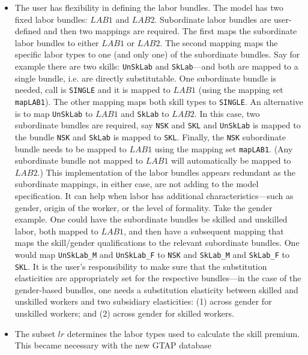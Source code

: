 \begin{itemize}
   \item The user has flexibility in defining the labor bundles. The model has
   two fixed labor bundles: $\mathit{LAB1}$ and $\mathit{LAB2}$. Subordinate labor
   bundles are user-defined and then two mappings are required. The first
   maps the subordinate labor bundles to either $\mathit{LAB1}$ or $\mathit{LAB2}$.
   The second mapping maps the specific labor types to one (and only one) of the
   subordinate bundles. Say for example there are two skills: \texttt{UnSkLab} and
   \texttt{SkLab}---and both are mapped to a single bundle, i.e. are directly
   substitutable. One subordinate bundle is needed, call is \texttt{SINGLE} and
   it is mapped to $\mathit{LAB1}$ (using the mapping set \texttt{mapLAB1}).
   The other mapping maps both skill types to \texttt{SINGLE}. An alternative
   is to map \texttt{UnSkLab} to $\mathit{LAB1}$ and \texttt{SkLab} to $\mathit{LAB2}$.
   In this case, two subordinate bundles are required, say \texttt{NSK}
   and \texttt{SKL} and \texttt{UnSkLab} is mapped to the bundle \texttt{NSK}
   and \texttt{SkLab} is mapped to \texttt{SKL}. Finally, the \texttt{NSK} subordinate
   bundle needs to be mapped to $\mathit{LAB1}$ using the  mapping set \texttt{mapLAB1}. (Any
   subordinate bundle not mapped to $\mathit{LAB1}$ will automatically be mapped to $\mathit{LAB2}$.)
   This implementation of the labor bundles appears redundant as the subordinate mappings,
   in either case, are not adding to the model specification. It can help when labor
   has additional characteristics---such as gender, origin of the worker, or
   the level of formality. Take the gender example. One could have the subordinate
   bundles be skilled and unskilled labor, both mapped to $\mathit{LAB1}$, and then
   have a subsequent mapping that maps the skill/gender qualifications to the
   relevant subordinate bundles. One would map \texttt{UnSkLab\_M} and \texttt{UnSkLab\_F}
   to \texttt{NSK} and \texttt{SkLab\_M} and \texttt{SkLab\_F} to \texttt{SKL}.
   It is the user's responsibility to make sure that the substitution elasticities
   are appropriately set for the respective bundles---in the case of the
   gender-based bundles, one needs a substitution elasticity between skilled and
   unskilled workers and two subsidiary elasticities: (1) across gender for
   unskilled workers; and (2) across gender for skilled workers.
   \item The subset $\mathit{lr}$ determines the labor types used to calculate
         the skill premium. This became necessary with the new GTAP database

\end{itemize}
